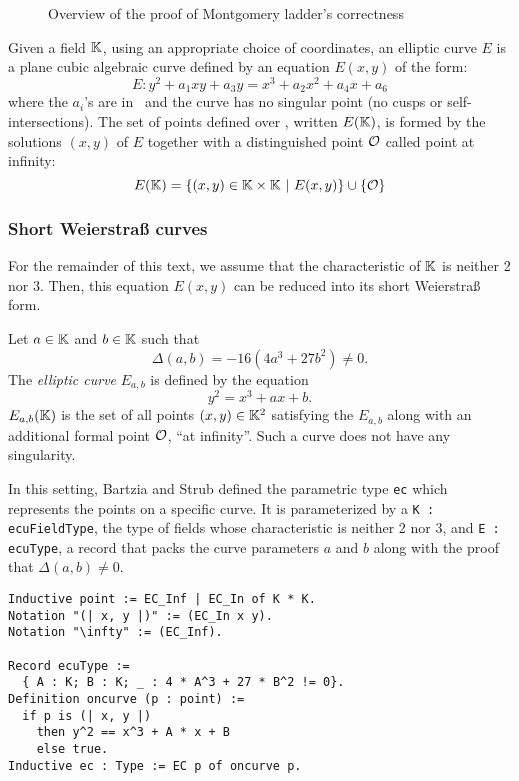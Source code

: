 \begin{figure}[h]
  \centering
  
  \caption{Overview of the proof of Montgomery ladder's correctness}
  \label{tikz:ProofHighLevel1}
\end{figure}

\begin{dfn}
  Given a field $\mathbb{K}$,
  using an appropriate choice of coordinates,
  an elliptic curve $E$
  is a plane cubic algebraic curve defined by an equation $E(x,y)$ of the form:
  $$E : y^2 + a_1 xy + a_3 y = x^3 + a_2 x^2 + a_4 x + a_6$$
  where the $a_i$'s are in \K\ and the curve has no singular point (\ie no cusps
  or self-intersections). The set of points defined over \K, written $E(\mathbb{K})$, is formed by the
  solutions $(x,y)$ of $E$ together with a distinguished point $\mathcal{O}$ called point at infinity:
  $$E(\mathbb{K}) = \{ (x,y) \in \mathbb{K} \times \mathbb{K} ~|~E(x,y)\} \cup \{\mathcal{O}\}$$
\end{dfn}

\subsubsection{Short Weierstra{\ss} curves}
\label{subsec:ECC-Weierstrass}

For the remainder of this text, we assume that the characteristic of $\mathbb{K}$ is neither 2 nor 3.
Then, this equation $E(x,y)$ can be reduced into its short Weierstra{\ss} form.

\begin{dfn}
  Let $a \in \mathbb{K}$ and $b \in \mathbb{K}$ such that $$\Delta(a,b) = -16(4a^3 + 27b^2) \neq 0.$$
  The \textit{elliptic curve} $E_{a,b}$ is defined by the equation
  $$y^2 = x^3 + ax + b.$$
  $E_{a,b}(\mathbb{K})$ is the set of all points $(x,y) \in \mathbb{K}^2$ satisfying the $E_{a,b}$
  along with an additional formal point $\mathcal{O}$, ``at infinity''. Such a curve does not have any singularity.
\end{dfn}

In this setting, Bartzia and Strub defined the parametric type \texttt{ec} which
represents the points on a specific curve. It is parameterized by
a \texttt{K : ecuFieldType}, the type of fields whose characteristic is neither 2 nor 3,
and \texttt{E : ecuType}, a record that packs the curve parameters $a$ and $b$
along with the proof that $\Delta(a,b) \neq 0$.
\begin{lstlisting}[language=Coq]
Inductive point := EC_Inf | EC_In of K * K.
Notation "(| x, y |)" := (EC_In x y).
Notation "\infty" := (EC_Inf).

Record ecuType :=
  { A : K; B : K; _ : 4 * A^3 + 27 * B^2 != 0}.
Definition oncurve (p : point) :=
  if p is (| x, y |)
    then y^2 == x^3 + A * x + B
    else true.
Inductive ec : Type := EC p of oncurve p.
\end{lstlisting}

